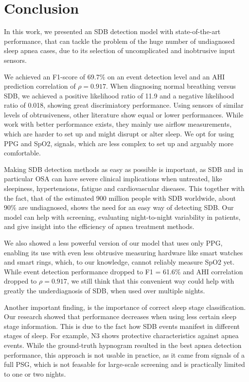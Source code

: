 \chapter{Conclusion \label{Chapter-Conclusion}}

In this work, we presented an SDB detection model with state-of-the-art performance, that can tackle the problem of the huge number of undiagnosed sleep apnea cases, due to its selection of uncomplicated and inobtrusive input sensors.

We achieved an F1-score of 69.7\% on an event detection level and an AHI prediction correlation of $\rho = 0.917$. When diagnosing normal breathing versus SDB, we achieved a positive likelihood ratio of 11.9 and a negative likelihood ratio of 0.018, showing great discrimiatory performance.
Using sensors of similar levels of obtrusiveness, other literature show equal or lower performances.
While work with better performance exists, they mainly use airflow measurements, which are harder to set up and might disrupt or alter sleep. We opt for using PPG and SpO2, signals, which are less complex to set up and arguably more comfortable.

Making SDB detection methods as easy as possible is important, as SDB and in particular OSA can have severe clinical implications when untreated, like sleepiness, hypertensions, fatigue and cardiovascular diseases. This together with the fact, that of the estimated 900 million people with SDB worldwide, about 90\% are undiagnosed, shows the need for an easy way of detecting SDB. Our model can help with screening, evaluating night-to-night variability in patients, and give insight into the efficiency of apnea treatment methods.

We also showed a less powerful version of our model that uses only PPG, enabling its use with even less obtrusive measuring hardware like smart watches and smart rings, which, to our knowledge, cannot reliably measure SpO2 yet.
While event detection performance dropped to F1 = 61.6\% and AHI correlation dropped to $\rho = 0.917$, we still think that this convenient way could help with greatly the underdiagnosis of SDB, when used over multiple nights. 

Another important finding, is the importance of correct sleep stage classification. Our research showed that performance decreases when using less certain sleep stage information. This is due to the fact how SDB events manifest in different stages of sleep. For example, N3 shows protective characteristics against apnea events. While the ground-truth hypnogram resulted in the best apnea detection performance, this approach is not usable in practice, as it came from signals of a full PSG, which is not feasable for large-scale screening and is practically limited to one or two nights.

